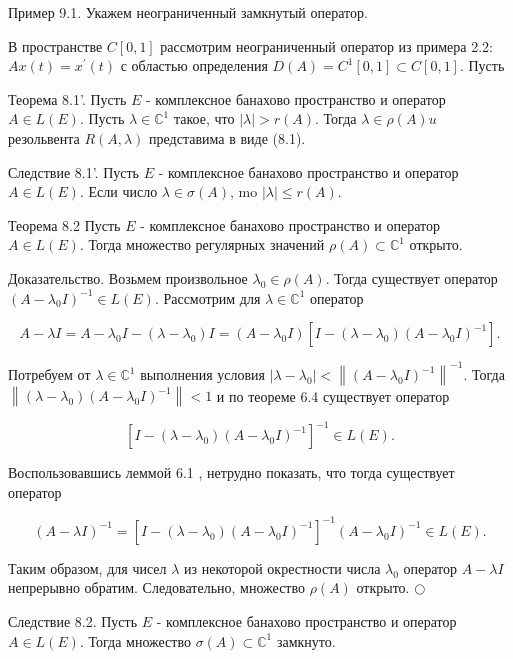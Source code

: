Пример 9.1. Укажем неограниченный замкнутый оператор.

В пространстве $C[0,1]$ рассмотрим неограниченный оператор из примера 2.2: $A x(t)=x^{\prime}(t)$ с областью определения $D(A)=C^{1}[0,1] \subset C[0,1]$. Пусть

Теорема 8.1'. Пусть $E$ - комплексное банахово пространство и оператор $A \in L(E)$. Пусть $\lambda \in \mathbb{C}^{1}$ такое, что $|\lambda|>r(A)$. Тогда $\lambda \in \rho(A) u$ резольвента $R(A, \lambda)$ представима в виде (8.1).

Следствие 8.1'. Пусть $E$ - комплексное банахово пространство и оператор $A \in L(E)$. Если число $\lambda \in \sigma(A)$, mo $|\lambda| \leq r(A)$.

Теорема 8.2 Пусть $E$ - комплексное банахово пространство и оператор $A \in L(E)$. Тогда множество регулярных значений $\rho(A) \subset \mathbb{C}^{1}$ открыто.

Доказательство. Возьмем произвольное $\lambda_{0} \in \rho(A)$. Тогда существует оператор $\left(A-\lambda_{0} I\right)^{-1} \in L(E)$. Рассмотрим для $\lambda \in \mathbb{C}^{1}$ оператор

\[
A-\lambda I=A-\lambda_{0} I-\left(\lambda-\lambda_{0}\right) I=\left(A-\lambda_{0} I\right)\left[I-\left(\lambda-\lambda_{0}\right)\left(A-\lambda_{0} I\right)^{-1}\right] .
\]

Потребуем от $\lambda \in \mathbb{C}^{1}$ выполнения условия $\left|\lambda-\lambda_{0}\right|<\left\|\left(A-\lambda_{0} I\right)^{-1}\right\|^{-1}$. Тогда $\left\|\left(\lambda-\lambda_{0}\right)\left(A-\lambda_{0} I\right)^{-1}\right\|<1$ и по теореме 6.4 существует оператор

\[
\left[I-\left(\lambda-\lambda_{0}\right)\left(A-\lambda_{0} I\right)^{-1}\right]^{-1} \in L(E) .
\]

Воспользовавшись леммой 6.1 , нетрудно показать, что тогда существует оператор

\[
(A-\lambda I)^{-1}=\left[I-\left(\lambda-\lambda_{0}\right)\left(A-\lambda_{0} I\right)^{-1}\right]^{-1}\left(A-\lambda_{0} I\right)^{-1} \in L(E) .
\]

Таким образом, для чисел $\lambda$ из некоторой окрестности числа $\lambda_{0}$ оператор $A-\lambda I$ непрерывно обратим. Следовательно, множество $\rho(A)$ открыто. $\bigcirc$

Следствие 8.2. Пусть $E$ - комплексное банахово пространство и оператор $A \in L(E)$. Тогда множество $\sigma(A) \subset \mathbb{C}^{1}$ замкнуто.

